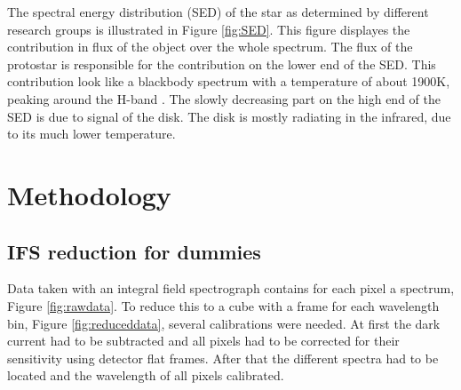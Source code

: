\documentclass[twoside,single]{lion-msc}
\begin{document}
The spectral energy distribution (SED) of the star as determined by different research groups is illustrated in Figure \ref{fig:SED}. This figure displayes the contribution in flux of the object over the whole spectrum. The flux of the protostar is responsible for the contribution on the lower end of the SED. This contribution look like a blackbody spectrum with a temperature of about 1900K, peaking around the H-band \citep{Padgett}. The slowly decreasing part on the high end of the SED is due to signal of the disk. The disk is mostly radiating in the infrared, due to its much lower temperature.

\chapter{Methodology}
\section{IFS reduction for dummies}
Data taken with an integral field spectrograph contains for each pixel a spectrum, Figure \ref{fig:rawdata}. To reduce this to a cube with a frame for each wavelength bin, Figure \ref{fig:reduceddata}, several calibrations were needed. At first the dark current had to be subtracted and all pixels had to be corrected for their sensitivity using detector flat frames. After that the different spectra had to be located and the wavelength of all pixels calibrated. 
\end{document}
